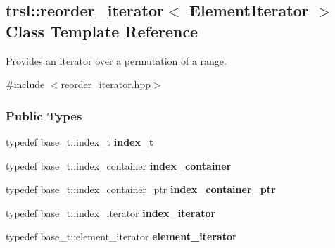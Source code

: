 \hypertarget{classtrsl_1_1reorder__iterator}{
\subsection{trsl::reorder\_\-iterator$<$ ElementIterator $>$ Class Template Reference}
\label{classtrsl_1_1reorder__iterator}
}


Provides an iterator over a permutation of a range.  


{\ttfamily \#include $<$reorder\_\-iterator.hpp$>$}\subsubsection*{Public Types}
\begin{DoxyCompactItemize}
\item 
\hypertarget{classtrsl_1_1reorder__iterator_a0ca5109afb6b10ac6402ac297b7886a7}{
typedef base\_\-t::index\_\-t {\bfseries index\_\-t}}
\label{classtrsl_1_1reorder__iterator_a0ca5109afb6b10ac6402ac297b7886a7}

\item 
\hypertarget{classtrsl_1_1reorder__iterator_ab951531d25c6878c6db9fd317463a0a1}{
typedef base\_\-t::index\_\-container {\bfseries index\_\-container}}
\label{classtrsl_1_1reorder__iterator_ab951531d25c6878c6db9fd317463a0a1}

\item 
\hypertarget{classtrsl_1_1reorder__iterator_a7aaf0f2cf4ced83dbba7c3e98ae85b19}{
typedef base\_\-t::index\_\-container\_\-ptr {\bfseries index\_\-container\_\-ptr}}
\label{classtrsl_1_1reorder__iterator_a7aaf0f2cf4ced83dbba7c3e98ae85b19}

\item 
\hypertarget{classtrsl_1_1reorder__iterator_a5d6d4f3a1a97ea085499f04642b2b0b6}{
typedef base\_\-t::index\_\-iterator {\bfseries index\_\-iterator}}
\label{classtrsl_1_1reorder__iterator_a5d6d4f3a1a97ea085499f04642b2b0b6}

\item 
\hypertarget{classtrsl_1_1reorder__iterator_a4da0589d734ec35638812b9ba9739233}{
typedef base\_\-t::element\_\-iterator {\bfseries element\_\-iterator}}
\label{classtrsl_1_1reorder__iterator_a4da0589d734ec35638812b9ba9739233}

\end{DoxyCompactItemize}
